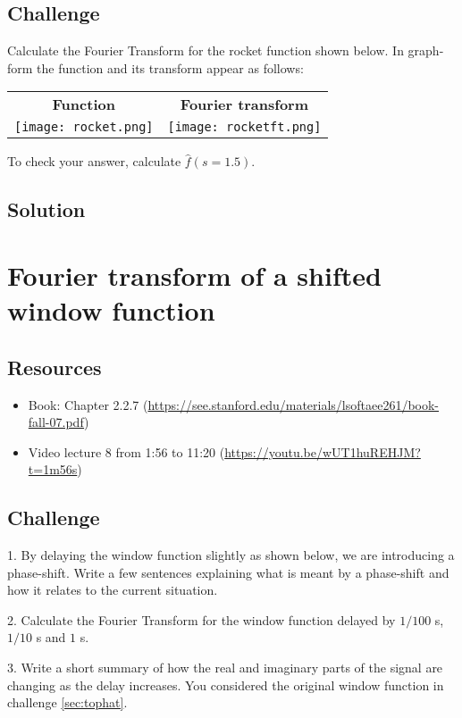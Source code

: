 \subsection*{Challenge}
Calculate the Fourier Transform for the rocket function shown below. In graph-form the function and its transform appear as follows:

\begin{tabular}{cc}
    \textbf{Function} & \textbf{Fourier transform} \\
    \texttt{[image: rocket.png]} & \texttt{[image: rocketft.png]}
\end{tabular}

To check your answer, calculate $\hat{f}(s=1.5)$.

\subsection*{Solution}




\newpage
\section{Fourier transform of a shifted window function}

\subsection*{Resources}
\begin{itemize}
    \item Book: Chapter 2.2.7 (\url{https://see.stanford.edu/materials/lsoftaee261/book-fall-07.pdf})
    \item Video lecture 8 from 1:56 to 11:20 (\url{https://youtu.be/wUT1huREHJM?t=1m56s})
\end{itemize}

\subsection*{Challenge}
1. By delaying the window function slightly as shown below, we are introducing a phase-shift. Write a few sentences explaining what is meant by a phase-shift and how it relates to the current situation.

2. Calculate the Fourier Transform for the window function delayed by $1/100$ s, $1/10$ s and $1$ s.

3. Write a short summary of how the real and imaginary parts of the signal are changing as the delay increases. You considered the original window function in challenge \ref{sec:tophat}.

